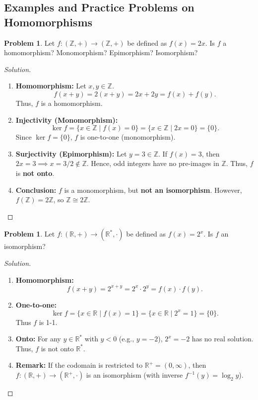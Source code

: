 \documentclass[12pt]{article}
\theoremstyle{definition}
\newtheorem{problem}[definition]{Problem}
\theoremstyle{plain}
\begin{document}
\subsection{Examples and Practice Problems on Homomorphisms}

\begin{problem}
Let $f: (\mathbb{Z}, +) \longrightarrow (\mathbb{Z}, +)$ be defined as $f(x) = 2x$.
Is $f$ a homomorphism? Monomorphism? Epimorphism? Isomorphism?
\end{problem}
\begin{proof}[Solution]
\begin{enumerate}
    \item \textbf{Homomorphism:}
    Let $x, y \in \mathbb{Z}$.
    \[
    f(x + y) = 2(x + y) = 2x + 2y = f(x) + f(y).
    \]
    Thus, $f$ is a homomorphism.

    \item \textbf{Injectivity (Monomorphism):}
    \[
    \ker f = \{x \in \mathbb{Z} \mid f(x) = 0\} = \{x \in \mathbb{Z} \mid 2x = 0\} = \{0\}.
    \]
    Since $\ker f = \{0\}$, $f$ is one-to-one (monomorphism).

    \item \textbf{Surjectivity (Epimorphism):}
    Let $y = 3 \in \mathbb{Z}$. If $f(x) = 3$, then $2x = 3 \implies x = 3/2 \notin \mathbb{Z}$.
    Hence, odd integers have no pre-images in $\mathbb{Z}$.
    Thus, $f$ is \textbf{not onto}.

    \item \textbf{Conclusion:} $f$ is a monomorphism, but \textbf{not an isomorphism}.
    However, $f(\mathbb{Z}) = 2\mathbb{Z}$, so $\mathbb{Z} \cong 2\mathbb{Z}$.
\end{enumerate}
\end{proof}

\begin{problem}
Let $f: (\mathbb{R}, +) \longrightarrow (\mathbb{R}^*, \cdot)$ be defined as $f(x) = 2^x$.
Is $f$ an isomorphism?
\end{problem}
\begin{proof}[Solution]
\begin{enumerate}
    \item \textbf{Homomorphism:}
    \[
    f(x + y) = 2^{x + y} = 2^x \cdot 2^y = f(x) \cdot f(y).
    \]
    \item \textbf{One-to-one:}
    \[
    \ker f = \{x \in \mathbb{R} \mid f(x) = 1\} = \{x \in \mathbb{R} \mid 2^x = 1\} = \{0\}.
    \]
    Thus $f$ is 1-1.
    \item \textbf{Onto:}
    For any $y \in \mathbb{R}^*$ with $y < 0$ (e.g., $y = -2$), $2^x = -2$ has no real solution.
    Thus, $f$ is not onto $\mathbb{R}^*$.
    \item \textbf{Remark:} If the codomain is restricted to $\mathbb{R}^+ = (0, \infty)$, then $f: (\mathbb{R}, +) \to (\mathbb{R}^+, \cdot)$ is an isomorphism (with inverse $f^{-1}(y) = \log_2 y$).
\end{enumerate}
\end{proof}
\end{document}
